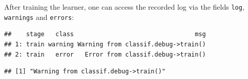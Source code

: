 \documentclass[
]{scrbook}
\newenvironment{Shaded}{\begin{snugshade}}{\end{snugshade}}
\newcommand{\AttributeTok}[1]{\textcolor[rgb]{0.77,0.63,0.00}{#1}}
\newcommand{\DecValTok}[1]{\textcolor[rgb]{0.00,0.00,0.81}{#1}}
\newcommand{\FunctionTok}[1]{\textcolor[rgb]{0.00,0.00,0.00}{#1}}
\newcommand{\NormalTok}[1]{#1}
\newcommand{\OtherTok}[1]{\textcolor[rgb]{0.56,0.35,0.01}{#1}}
\newcommand{\SpecialCharTok}[1]{\textcolor[rgb]{0.00,0.00,0.00}{#1}}
\newcommand{\StringTok}[1]{\textcolor[rgb]{0.31,0.60,0.02}{#1}}
\renewenvironment{Shaded} {\begin{snugshade}\small} {\end{snugshade}}
\begin{document}
\begin{Shaded}
\end{Shaded}

After training the learner, one can access the recorded log via the fields \texttt{log}, \texttt{warnings} and \texttt{errors}:

\begin{Shaded}
\end{Shaded}

\begin{verbatim}
##    stage   class                                 msg
## 1: train warning Warning from classif.debug->train()
## 2: train   error   Error from classif.debug->train()
\end{verbatim}

\begin{Shaded}
\end{Shaded}

\begin{verbatim}
## [1] "Warning from classif.debug->train()"
\end{verbatim}

\begin{Shaded}
\end{Shaded}
\end{document}
